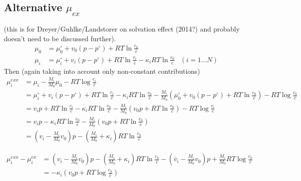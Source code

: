 \documentclass[12pt,oneside,reqno]{amsart}
\numberwithin{equation}{section}
\begin{document}
\subsection{Alternative $\mu_{ex}$}
(this is for Dreyer/Guhlke/Landstorer on solvation effect (2014?) and probably
doesn't need to be discussed further).
\begin{align}
  \mu_0 &= \mu_0^\circ + v_0(p-p^\circ) + RT \ln \frac{c_0}{\bar c}\\
  \mu_i &= \mu_i^\circ + v_i(p-p^\circ) + RT \ln \frac{c_i}{\bar c} - \kappa_i RT \ln \frac{c_0}{\bar c}  & (i=1\dots N)
\end{align}
Then (again taking into account only non-constant contributions)
\begin{align}
  \mu_i^{exx} &=  \mu_i - \frac{M_i}{M_0} \mu_0  - RT \log \frac{c_i}{\bar c} \nonumber\\
             &= \mu_i^\circ + v_i(p-p^\circ) + RT \ln \frac{c_i}{\bar c} - \kappa_i RT \ln \frac{c_0}{\bar c}
               - \frac{M_i}{M_0}\left(\mu_0^\circ + v_0(p-p^\circ) + RT \ln \frac{c_0}{\bar c}\right)- RT \log \frac{c_0}{\bar c}\\
             &= v_ip + RT \ln \frac{c_i}{\bar c} - \kappa_i RT \ln \frac{c_0}{\bar c}
               - \frac{M_i}{M_0}\left(v_0 p + RT \ln \frac{c_0}{\bar c}\right)- RT \log \frac{c_i}{\bar c}\\
             &= v_ip  - \kappa_i RT \ln \frac{c_0}{\bar c}
               - \frac{M_i}{M_0}\left(v_0 p + RT \ln \frac{c_0}{\bar c}\right)\\
             &= (v_i -\frac{M_i}{M_0}v_0)p  - \left(\frac{M_i}{M_0}+ \kappa_i\right)RT \ln \frac{c_0}{\bar c}
\end{align}

\begin{align}
\mu_i^{exx}-\mu_i^{ex}&=(v_i -\frac{M_i}{M_0}v_0)p  - \left(\frac{M_i}{M_0}+ \kappa_i\right)RT \ln \frac{c_0}{\bar c}
                        -  \left(\bar v_i-\frac{M_i}{M_0}v_0\right)p + \frac{M_i}{M_0}RT\log \frac{c_0}{\bar c}\\
                      &= -\kappa_i \left(v_0p+RT\log \frac{c_0}{\bar c}\right)
\end{align}
\end{document}
